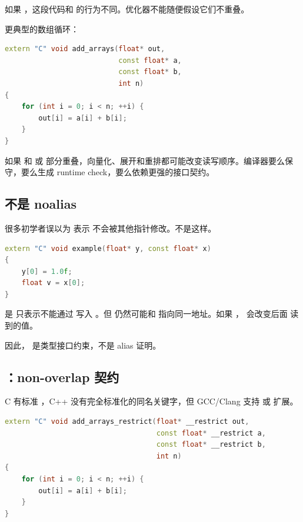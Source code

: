 如果 ，这段代码和  的行为不同。优化器不能随便假设它们不重叠。

更典型的数组循环：

\begin{lstlisting}[language=C++]
extern "C" void add_arrays(float* out,
                           const float* a,
                           const float* b,
                           int n)
{
    for (int i = 0; i < n; ++i) {
        out[i] = a[i] + b[i];
    }
}
\end{lstlisting}

如果  和  或  部分重叠，向量化、展开和重排都可能改变读写顺序。编译器要么保守，要么生成 runtime check，要么依赖更强的接口契约。

\subsection{ 不是 noalias}

很多初学者误以为  表示  不会被其他指针修改。不是这样。

\begin{lstlisting}[language=C++]
extern "C" void example(float* y, const float* x)
{
    y[0] = 1.0f;
    float v = x[0];
}
\end{lstlisting}

 是  只表示不能通过  写入 。但  仍然可能和  指向同一地址。如果 ， 会改变后面  读到的值。

因此， 是类型接口约束，不是 alias 证明。

\subsection{：non-overlap 契约}

C 有标准 ，C++ 没有完全标准化的同名关键字，但 GCC/Clang 支持  或  扩展。

\begin{lstlisting}[language=C++]
extern "C" void add_arrays_restrict(float* __restrict out,
                                    const float* __restrict a,
                                    const float* __restrict b,
                                    int n)
{
    for (int i = 0; i < n; ++i) {
        out[i] = a[i] + b[i];
    }
}
\end{lstlisting}


